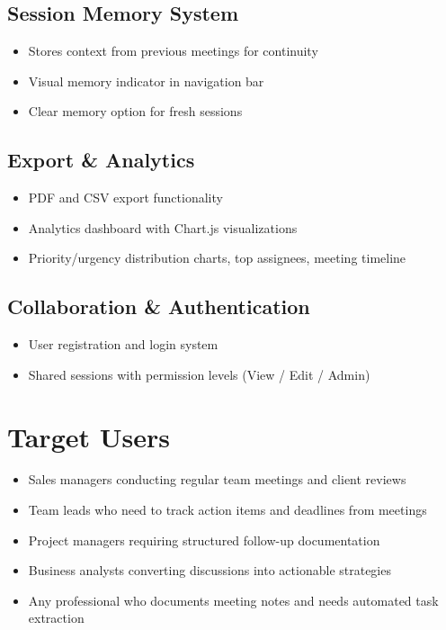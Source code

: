 \documentclass[12pt,a4paper]{article}
\begin{document}
\subsection{Session Memory System}
\begin{itemize}
  \item Stores context from previous meetings for continuity
  \item Visual memory indicator in navigation bar
  \item Clear memory option for fresh sessions
\end{itemize}

\subsection{Export \& Analytics}
\begin{itemize}
  \item PDF and CSV export functionality
  \item Analytics dashboard with Chart.js visualizations
  \item Priority/urgency distribution charts, top assignees, meeting timeline
\end{itemize}

\subsection{Collaboration \& Authentication}
\begin{itemize}
  \item User registration and login system
  \item Shared sessions with permission levels (View / Edit / Admin)
\end{itemize}


\section{Target Users}

\begin{itemize}
  \item Sales managers conducting regular team meetings and client reviews
  \item Team leads who need to track action items and deadlines from meetings
  \item Project managers requiring structured follow-up documentation
  \item Business analysts converting discussions into actionable strategies
  \item Any professional who documents meeting notes and needs automated task extraction
\end{itemize}
\end{document}
